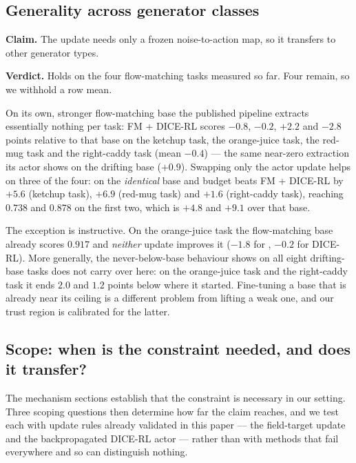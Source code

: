 \subsection{Generality across generator classes}
\label{sec:exp-generality}

\textbf{Claim.} The update needs only a frozen noise-to-action map, so it
transfers to other generator types.

\textbf{Verdict.} Holds on the four flow-matching tasks measured so far.
Four remain, so we withhold a row mean.

On its own, stronger flow-matching base the published pipeline extracts
essentially nothing per task: FM + DICE-RL scores $-0.8$, $-0.2$, $+2.2$ and
$-2.8$ points relative to that base on the ketchup task, the orange-juice task, the red-mug task and the right-caddy task (mean $-0.4$)
--- the same near-zero extraction its actor shows on the drifting base
($+0.9$). Swapping only the actor update helps on three of the four:
\method{} on the \emph{identical} base and budget beats FM + DICE-RL by
$+5.6$ (ketchup task), $+6.9$ (red-mug task) and $+1.6$ (right-caddy task), reaching $0.738$ and $0.878$ on
the first two, which is $+4.8$ and $+9.1$ over that base.

The exception is instructive. On the orange-juice task the flow-matching base already scores
$0.917$ and \emph{neither} update improves it ($-1.8$ for \method{}, $-0.2$
for DICE-RL). More generally, the never-below-base behaviour \method{} shows
on all eight drifting-base tasks does not carry over here: on the orange-juice task and the right-caddy task it
ends $2.0$ and $1.2$ points below where it started. Fine-tuning a base that
is already near its ceiling is a different problem from lifting a weak one,
and our trust region is calibrated for the latter.

\subsection{Scope: when is the constraint needed, and does it transfer?}
\label{sec:exp-scope}

The mechanism sections establish that the constraint is necessary in our
setting. Three scoping questions then determine how far the claim reaches,
and we test each with update rules already validated in this paper --- the
field-target update and the backpropagated DICE-RL actor --- rather than
with methods that fail everywhere and so can distinguish nothing.

